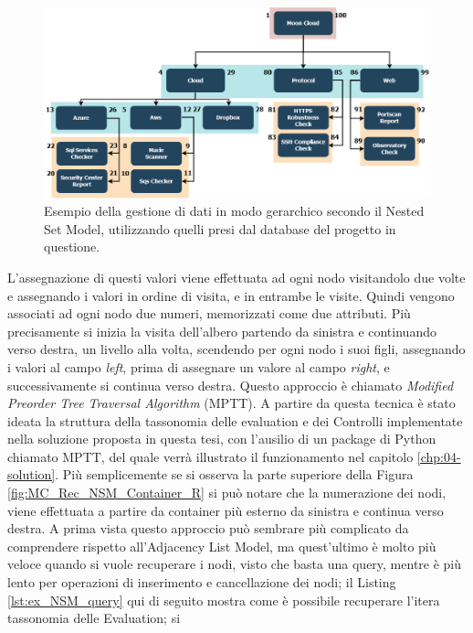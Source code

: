 \begin{figure}[ht!]
    \centering
    \includegraphics[scale=0.40]{images/MC_Rec_NSM_Tree.png}
    \caption{Esempio della gestione di dati in modo gerarchico secondo il Nested Set Model, utilizzando quelli presi dal database del 
    progetto in questione.}
    \label{fig:MC_Rec_NSM_Tree}
\end{figure}
\vspace{-0.5 cm}
\hfill\break
L'assegnazione di questi valori viene effettuata ad ogni nodo visitandolo due volte e assegnando i valori in ordine di visita, e in entrambe le visite. 
Quindi vengono associati ad ogni nodo due numeri, memorizzati come due attributi. 
Più precisamente si inizia la visita dell'albero partendo da sinistra e continuando verso destra, un livello alla volta, scendendo per ogni 
nodo i suoi figli, assegnando i valori al campo \textit{left}, prima di assegnare un valore al campo \textit{right}, e successivamente si continua verso 
destra. Questo approccio è chiamato \textit{Modified Preorder Tree Traversal Algorithm} (MPTT). A partire da questa tecnica è stato 
ideata la struttura della tassonomia delle evaluation e dei Controlli implementate nella soluzione proposta in questa tesi, con 
l'ausilio di un package di Python chiamato MPTT, del quale verrà illustrato il funzionamento nel capitolo \ref{chp:04-solution}.\hfill\break
Più semplicemente se si osserva la parte superiore della Figura \ref{fig:MC_Rec_NSM_Container_R} si può notare che la numerazione dei nodi, viene 
effettuata a partire da container più esterno da sinistra e continua verso destra.\hfill\break
A prima vista questo approccio può sembrare più complicato da comprendere rispetto all'Adjacency List Model, ma quest'ultimo è 
molto più veloce quando si vuole recuperare i nodi, visto che basta una query, mentre è più lento per operazioni di inserimento e 
cancellazione dei nodi; il Listing \ref{lst:ex_NSM_query} qui di seguito mostra come è possibile recuperare l'itera tassonomia delle Evaluation; si 
